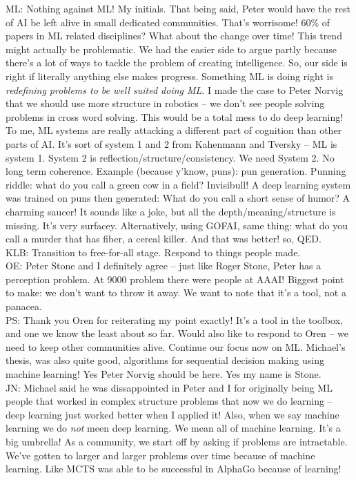 ML: Nothing against ML! My initials. That being said, Peter would have the rest of AI be left alive in small dedicated communities. That's worrisome! 60\% of papers in ML related disciplines? What about the change over time! This trend might actually be problematic. We had the easier side to argue partly because there's a lot of ways to tackle the problem of creating intelligence. So, our side is right if literally anything else makes progress. Something ML is doing right is {\it redefining problems to be well suited doing ML}. I made the case to Peter Norvig that we should use more structure in robotics -- we don't see people solving problems in cross word solving. This would be a total mess to do deep learning! To me, ML systems are really attacking a different part of cognition than other parts of AI. It's sort of system 1 and 2 from Kahenmann and Tversky -- ML is system 1. System 2 is reflection/structure/consistency. We need System 2. No long term coherence. Example (because y'know, puns): pun generation. Punning riddle: what do you call a green cow in a field? Invisibull! A deep learning system was trained on puns then generated: What do you call a short sense of humor? A charming saucer! It sounds like a joke, but all the depth/meaning/structure is missing. It's very surfacey. Alternatively, using GOFAI, same thing: what do you call a murder that has fiber, a cereal killer. And that was better! so, QED. \\

KLB: Transition to free-for-all stage. Respond to things people made. \\

OE: Peter Stone and I definitely agree -- just like Roger Stone, Peter has a perception problem. At 9000 problem there were people at AAAI! Biggest point to make: we don't want to throw it away. We want to note that it's a tool, not a panacea. \\

PS: Thank you Oren for reiterating my point exactly! It's a tool in the toolbox, and one we know the least about so far. Would also like to respond to Oren -- we need to keep other communities alive. Continue our focus now on ML. Michael's thesis, was also quite good, algorithms for sequential decision making using machine learning! Yes Peter Norvig should be here. Yes my name is Stone. \\

JN: Michael said he was dissappointed in Peter and I for originally being ML people that worked in complex structure problems that now we do learning -- deep learning just worked better when I applied it! Also, when we say machine learning we do {\it not} meen deep learning. We mean all of machine learning. It's a big umbrella! As a community, we start off by asking if problems are intractable. We've gotten to larger and larger problems over time because of machine learning. Like MCTS was able to be successful in AlphaGo because of learning! \\

